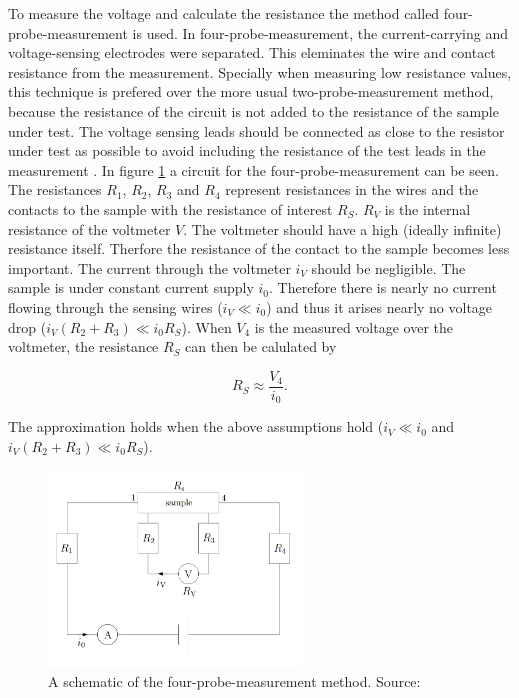 \documentclass[a4paper]{article}
\begin{document}
To measure the voltage and calculate the resistance the method called four-probe-measurement is used. In four-probe-measurement, the current-carrying and voltage-sensing electrodes were separated. This eleminates the wire and contact resistance from the measurement. Specially when measuring low resistance values, this technique is prefered over the more usual two-probe-measurement method, because the resistance of the circuit is not added to the resistance of the sample under test. The voltage sensing leads should be connected as close to the resistor under test as possible to avoid including the resistance of the test leads in the measurement \cite{llmh}. In figure \ref{fig:fourprobe} a circuit for the four-probe-measurement can be seen. The resistances $R_1$, $R_2$, $R_3$ and $R_4$ represent resistances in the wires and the contacts to the sample with the resistance of interest $R_S$. $R_V$ is the internal resistance of the voltmeter $V$. The voltmeter should have a high (ideally infinite) resistance itself. Therfore the resistance of the contact to the sample becomes less important. The current through the voltmeter $i_V$ should be negligible. The sample is under constant current supply $i_0$. Therefore there is nearly no current flowing through the sensing wires ($i_V \ll i_0$) and thus it arises nearly no voltage drop ($i_V \left( R_2 + R_3 \right) \ll i_0 R_S$). When $V_4$ is the measured voltage over the voltmeter, the resistance $R_S$ can then be calulated by

\begin{equation}
R_S \approx \frac{V_4}{i_0}.
\end{equation}

The approximation holds when the above assumptions hold ($i_V \ll i_0$ and $i_V \left( R_2 + R_3 \right) \ll i_0 R_S$).

\begin{figure}[H]
\captionsetup{singlelinecheck=off}
\centering
\includegraphics[width=0.6\textwidth]{img/fourprobe.jpg}
\caption[blubb]{A schematic of the four-probe-measurement method. Source: \cite{inst2014}}
\label{fig:fourprobe}
\end{figure}
\end{document}
